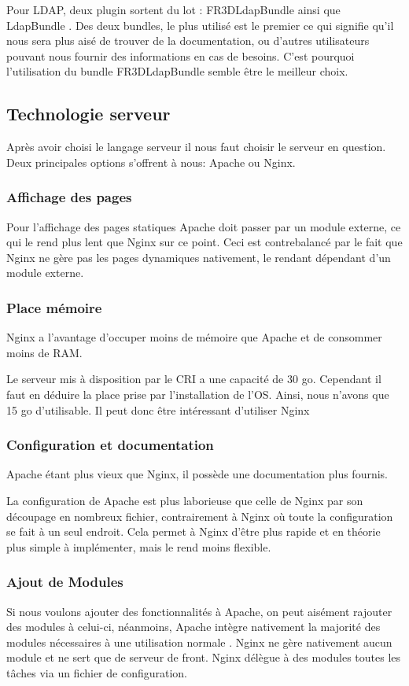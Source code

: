 Pour LDAP, deux plugin sortent du lot : \og FR3DLdapBundle \fg ainsi que \og LdapBundle \fg. Des deux bundles, le plus utilisé est le premier ce qui signifie qu'il nous sera plus aisé de trouver de la documentation, ou d’autres utilisateurs pouvant nous fournir des informations en cas de besoins. C'est pourquoi l'utilisation du bundle \og FR3DLdapBundle \fg semble être le meilleur choix.

\subsection{Technologie serveur}

Après avoir choisi le langage serveur il nous faut choisir le serveur en question. Deux principales options s'offrent à nous: Apache ou Nginx.

\subsubsection{Affichage des pages}
Pour l'affichage des pages statiques Apache doit passer par un module externe, ce qui le rend plus lent que Nginx sur ce point.
Ceci est contrebalancé par le fait que Nginx ne gère pas les pages dynamiques nativement, le rendant dépendant d'un module externe.

\subsubsection{Place mémoire}
Nginx a l'avantage d'occuper moins de mémoire que Apache et de consommer moins de RAM.

Le serveur mis à disposition par le CRI a une capacité de 30 go. Cependant il faut en déduire  la place prise par l'installation de l'OS. Ainsi, nous n'avons que 15 go d'utilisable. Il peut donc être intéressant d'utiliser Nginx
\subsubsection{Configuration et documentation}
Apache étant plus vieux que Nginx, il possède une documentation plus fournis.

La configuration de Apache est plus laborieuse que celle de Nginx par son découpage en nombreux fichier, contrairement à Nginx où toute la configuration se fait à un seul endroit.
Cela permet à Nginx d'être plus rapide et en théorie plus simple à implémenter, mais le rend moins flexible.

\subsubsection{Ajout de Modules}
Si nous voulons ajouter des fonctionnalités à Apache, on peut aisément rajouter des modules à celui-ci, néanmoins, Apache intègre nativement la majorité des modules nécessaires à une utilisation \og normale \fg. Nginx ne gère nativement aucun module et ne sert que de serveur de front. Nginx délègue à des modules toutes les tâches via un fichier de configuration.


